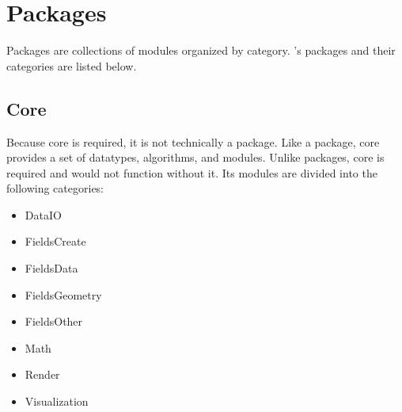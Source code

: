 %
% 
% 
% 
%  
% 
% 
%

%

\chapter{Packages}
\label{ch:packages}

Packages are collections of modules organized by category. \sr{}'s 
packages and their categories are listed below.   

\section{\sr{} Core}
\label{sec:srpackage}

Because \sr{} core is required, it is not technically a package.
Like a package, \sr{} core provides a set of datatypes, algorithms,
and modules.  Unlike packages, \sr{} core is required and \sr{} would
not function without it. Its modules are divided into the
following categories:

\begin{itemize}
  \item DataIO
  \item FieldsCreate
  \item FieldsData
  \item FieldsGeometry
  \item FieldsOther
  \item Math
  \item Render
  \item Visualization
\end{itemize}

